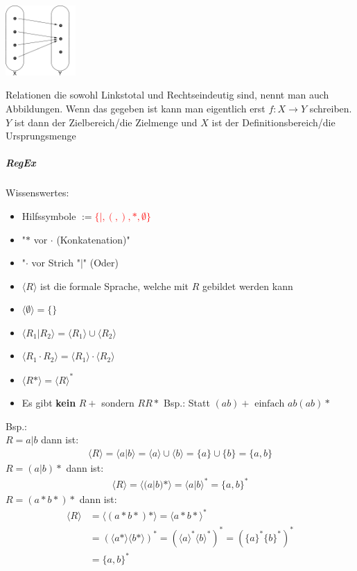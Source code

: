 \documentclass[12pt]{article}
\begin{document}
\begin{flushleft}
\begin{itemize}
        \includegraphics[width=0.2\textwidth]{linkstotal.png}
    \end{itemize}
    Relationen die sowohl Linkstotal und Rechtseindeutig sind, nennt man auch Abbildungen. Wenn das gegeben ist kann man eigentlich erst $f: X \rightarrow Y$ schreiben.
    $Y$ ist dann der Zielbereich/die Zielmenge und $X$ ist der Definitionsbereich/die Ursprungsmenge
\end{flushleft}
\subparagraph{\large RegEx}
\normalsize
\begin{flushleft}
    Wissenswertes:
    \begin{itemize}
        \item Hilfssymbole $:=$\textcolor{red}{$\{|,(,),\ast,\emptyset\}$}
        \item "$\ast$ vor $\cdot$ (Konkatenation)"
        \item "$\cdot$ vor Strich "$|$" (Oder)
        \item $\langle R \rangle$ ist die formale Sprache, welche mit $R$ gebildet werden kann
        \item $\langle \emptyset \rangle = \{\}$
        \item $\langle R_1| R_2 \rangle = \langle R_1 \rangle \cup \langle R_2 \rangle$
        \item $\langle R_1 \cdot R_2 \rangle =\langle R_1 \rangle \cdot \langle R_2 \rangle$
        \item $\langle R \ast \rangle = \langle R \rangle ^\ast$
        \item Es gibt \textbf{kein} $R+$ sondern $RR\ast$ Bsp.: Statt $(ab)+ \text{ einfach } ab(ab)\ast$
    \end{itemize}
    Bsp.: \\
    $R = a|b$ dann ist:
    \begin{align*}
        \langle R \rangle = \langle a | b \rangle = \langle a \rangle \cup \langle b \rangle = \{a\} \cup \{b\} = \{a,b\}
    \end{align*}
    $R = (a|b)\ast$ dann ist:
    \begin{align*}
        \langle R \rangle = \langle (a|b)\ast \rangle = \langle a | b \rangle^\ast = \{a,b\}^\ast
    \end{align*}
    $R = (a\ast b\ast)\ast$ dann ist:
    \begin{align*}
        \langle R \rangle &= \langle (a\ast b\ast)\ast \rangle = \langle a\ast b\ast\rangle^\ast \\
        &= (\langle a\ast\rangle\langle b\ast\rangle)^\ast = (\langle a\rangle^\ast\langle b\rangle^\ast)^\ast = (\{a\}^\ast\{b\}^\ast)^\ast \\
        &= \{a,b\}^\ast
    \end{align*}
\end{flushleft}
\end{document}
